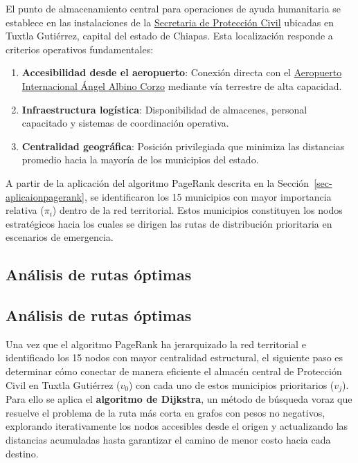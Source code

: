 \documentclass[
  spanish,
  us-letterpaper,
]{scrreprt}
\providecommand{\tightlist}{%
  \setlength{\itemsep}{0pt}\setlength{\parskip}{0pt}}
\numberwithin{equation}{section}
\begin{document}
El punto de almacenamiento central para operaciones de ayuda humanitaria
se establece en las instalaciones de la
\href{https://maps.app.goo.gl/fRNWcaote5heu1Qp9}{Secretaria de
Protección Civil} ubicadas en Tuxtla Gutiérrez, capital del estado de
Chiapas. Esta localización responde a criterios operativos
fundamentales:

\begin{enumerate}
\def\labelenumi{\arabic{enumi}.}
\tightlist
\item
  \textbf{Accesibilidad desde el aeropuerto}: Conexión directa con el
  \href{https://maps.app.goo.gl/kip9Nrw984oCGX7ZA}{Aeropuerto
  Internacional Ángel Albino Corzo} mediante vía terrestre de alta
  capacidad.
\item
  \textbf{Infraestructura logística}: Disponibilidad de almacenes,
  personal capacitado y sistemas de coordinación operativa.
\item
  \textbf{Centralidad geográfica}: Posición privilegiada que minimiza
  las distancias promedio hacia la mayoría de los municipios del estado.
\end{enumerate}

A partir de la aplicación del algoritmo PageRank descrita en la
Sección~\ref{sec-aplicaionpagerank}, se identificaron los 15 municipios
con mayor importancia relativa (\(\pi_i\)) dentro de la red territorial.
Estos municipios constituyen los nodos estratégicos hacia los cuales se
dirigen las rutas de distribución prioritaria en escenarios de
emergencia.

\subsection{Análisis de rutas
óptimas}\label{anuxe1lisis-de-rutas-uxf3ptimas}

\subsection{Análisis de rutas
óptimas}\label{anuxe1lisis-de-rutas-uxf3ptimas-1}

Una vez que el algoritmo PageRank ha jerarquizado la red territorial e
identificado los 15 nodos con mayor centralidad estructural, el
siguiente paso es determinar cómo conectar de manera eficiente el
almacén central de Protección Civil en Tuxtla Gutiérrez (\(v_0\)) con
cada uno de estos municipios prioritarios (\(v_j\)). Para ello se aplica
el \textbf{algoritmo de Dijkstra}, un método de búsqueda voraz que
resuelve el problema de la ruta más corta en grafos con pesos no
negativos, explorando iterativamente los nodos accesibles desde el
origen y actualizando las distancias acumuladas hasta garantizar el
camino de menor costo hacia cada destino.
\end{document}
